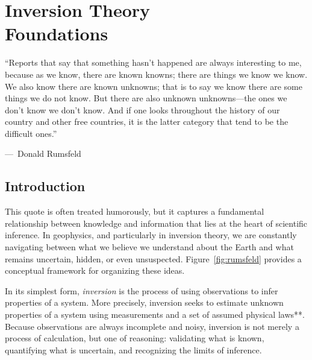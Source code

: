 \chapter[Inversion Theory: Foundations]{Inversion Theory\\ {\LARGE Foundations}}\label{ch:inversion}

\epigraph{``Reports that say that something hasn't happened are always interesting to me, because as we know, there are known knowns; there are things we know we know. We also know there are known unknowns; that is to say we know there are some things we do not know. But there are also unknown unknowns---the ones we don't know we don't know. And if one looks throughout the history of our country and other free countries, it is the latter category that tend to be the difficult ones.''}
{{\normalfont ---\ Donald Rumsfeld}}

\section{Introduction}
This quote is often treated humorously, but it captures a fundamental relationship between knowledge and information that lies at the heart of scientific inference. In geophysics, and particularly in inversion theory, we are constantly navigating between what we believe we understand about the Earth and what remains uncertain, hidden, or even unsuspected. Figure~\ref{fig:rumsfeld} provides a conceptual framework for organizing these ideas.


In its simplest form, \emph{inversion} is the process of using observations to infer properties of a system. More precisely, inversion seeks to estimate unknown properties of a system using measurements and a set of assumed physical laws**. Because observations are always incomplete and noisy, inversion is not merely a process of calculation, but one of reasoning: validating what is known, quantifying what is uncertain, and recognizing the limits of inference.

